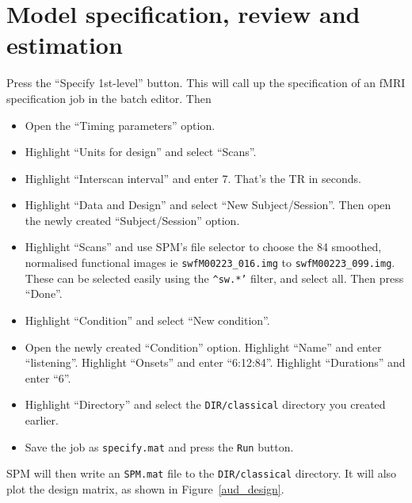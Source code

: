 \section{Model specification, review and estimation}

Press the ``Specify 1st-level'' button. This will call up the specification of an fMRI specification job in the batch editor. Then

\begin{itemize}
\item Open the ``Timing parameters'' option.
\item Highlight ``Units for design'' and select ``Scans''.
\item Highlight ``Interscan interval'' and enter 7. That's the TR in seconds.
\item Highlight ``Data and Design'' and select ``New Subject/Session''. Then open the newly created ``Subject/Session'' option.
\item Highlight ``Scans'' and use SPM's file selector to choose the 84 smoothed, normalised functional images ie \texttt{swfM00223\_016.img} to \texttt{swfM00223\_099.img}. These can be selected easily using the \texttt{\textasciicircum sw.*'} filter, and select all. Then press ``Done''.
\item Highlight ``Condition'' and select ``New condition''.
\item Open the newly created ``Condition'' option. Highlight ``Name'' and enter ``listening''. Highlight ``Onsets'' and enter ``6:12:84''. Highlight ``Durations'' and enter ``6''.
\item Highlight ``Directory'' and select the \texttt{DIR/classical} directory you created earlier.
\item Save the job as \texttt{specify.mat} and press the \texttt{Run} button.
\end{itemize}

SPM will then write an \texttt{SPM.mat} file to the \texttt{DIR/classical} directory. It will also plot the design matrix, as shown in Figure~\ref{aud_design}. 

